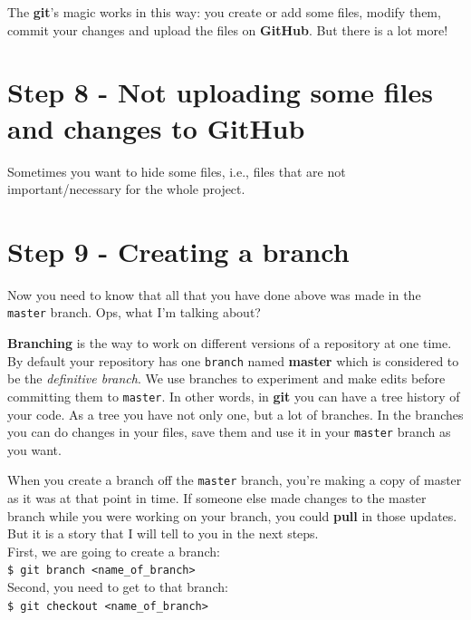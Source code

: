 \documentclass[12pt,a4paper,titlepage,brazil]{article}
\begin{document}
{The {\bf git}'s magic works in this way: you create or add some files, modify them, commit your changes and upload the files on {\bf GitHub}. But there is a lot more!


\section{Step 8 - Not uploading some files and changes to GitHub}

Sometimes you want to hide some files, i.e., files that are not important/necessary for the whole project. 


\section{Step 9 - Creating a branch}

Now you need to know that all that you have done above was made in the \texttt{master} branch. Ops, what I'm talking about?

{\bf Branching} is the way to work on different versions of a repository at one time. By default your repository has one \texttt{branch} named {\bf master} which is considered to be the {\em definitive branch}. We use branches to experiment and make edits before committing them to \texttt{master}. In other words, in {\bf git} you can have a tree history of your code. As a tree you have not only one, but a lot of branches. In the branches you can do changes in your files, save them and use it in your \texttt{master} branch as you want.

When you create a branch off the \texttt{master} branch, you’re making a copy of master as it was at that point in time. If someone else made changes to the master branch while you were working on your branch, you could {\bf pull} in those updates. But it is a story that I will tell to you in the next steps.\\

First, we are going to create a branch:\\

\texttt{\$ git branch <name\_of\_branch>}\\

Second, you need to get to that branch:\\

\texttt{\$ git checkout <name\_of\_branch>}\\

}
\end{document}
